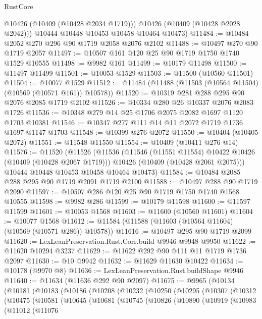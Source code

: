 \begin{lexlean}{RustCore}
\begin{coremodule}
          @10426
          (@10409 (@10428 @2034 @1719)))
        @10426
        (@10409 (@10428 @2028 @2042)))
      @10444
      @10448
      @10453
      @10458
      @10464
      @10473)
@11484 := @10484 @2052 @270 @296 @90 @1719 @2058 @2076 @2102
@11488 := @10497 @270 @90 @1719 @2057
@11497 := @10507 @161 @120 @25 @90 @1719 @1750 @1740 @1529 @10555
@11498 := @9982 @161
@11499 := @10179 @11498
@11500 := @11497 @11499
@11501 := @10053 @1529
@11503 := @11500 (@10560 @11501)
@11504 := @10077 @1529
@11512 := @11484 (@11488 (@11503 (@10564 @11504) (@10569 (@10571 @161)) @10578))
@11520 := @10319 @281 @288 @295 @90 @2076 @2085 @1719 @2102
@11526 := @10334 @280 @26 @10337 @2076 @2083 @1726
@11536 := @10348 @279 @14 @25 @1706 @2075 @2082 @1697 @1120 @1703 @10381
@11546 := @10347 @277 @111 @14 @11 @2072 @1719 @1736 @1697 @1147 @1703
@11548 := @10399 @276 @2072
@11550 := @10404 (@10405 @2072)
@11551 := @11548 @11550
@11554 := @10409 (@10411 @276 @14)
@11576 := @11520
    (@11526
      (@11536
        (@11546 (@11551 @11554) @10422 @10426 (@10409 (@10428 @2067 @1719)))
        @10426
        (@10409 (@10428 @2061 @2075)))
      @10444
      @10448
      @10453
      @10458
      @10464
      @10473)
@11584 := @10484 @2085 @288 @295 @90 @1719 @2091 @1719 @2100
@11588 := @10497 @288 @90 @1719 @2090
@11597 := @10507 @286 @120 @25 @90 @1719 @1750 @1740 @1568 @10555
@11598 := @9982 @286
@11599 := @10179 @11598
@11600 := @11597 @11599
@11601 := @10053 @1568
@11603 := @11600 (@10560 @11601)
@11604 := @10077 @1568
@11612 := @11584 (@11588 (@11603 (@10564 @11604) (@10569 (@10571 @286)) @10578))
@11616 := @10497 @295 @90 @1719 @2099
@11620 := LexLeanPreservation.Rust.Corr.build @9946 @9948 @9950
@11622 := @11620 @10294 @3237
@11629 := @11622 @292 @90 @111 @11 @1719 @1736 @2097
@11630 := @10 @9942
@11632 := @11629 @11630 @10422
@11634 := @10178 (@9970 @8)
@11636 := LexLeanPreservation.Rust.buildShape @9946
@11640 := @11634 (@11636 @292 @90 @2097)
@11675 := @9965
    (@10134
      (@10181
        (@10183
          (@10186
            (@10208
              (@10232
                (@10250
                  (@10295
                    (@10307
                      (@10312
                        (@10475
                          (@10581
                            (@10645
                              (@10681
                                (@10745
                                  (@10826
                                    (@10890
                                      (@10919
                                        (@10983
                                          (@11012
                                            (@11076

\end{coremodule}
\end{lexlean}
